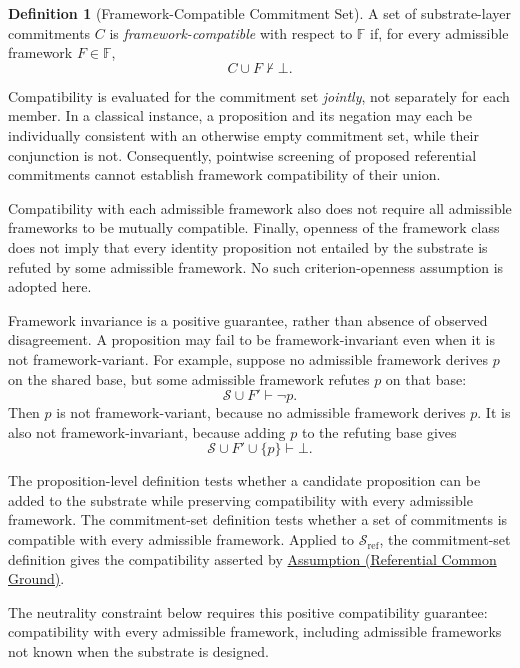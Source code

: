 \documentclass[11pt]{article}
\theoremstyle{plain}
\theoremstyle{definition}
\newtheorem{definition}[theorem]{Definition}
\theoremstyle{remark}
\newcommand{\AssumpRef}[2]{\hyperref[#1]{Assumption (#2)}}
\newcommand{\Substrate}{\mathcal{S}}
\newcommand{\SubstrateRef}{\mathcal{S}_{\mathrm{ref}}}
\newcommand{\Frameworks}{\mathbb{F}}
\newcommand{\Framework}{F}
\newcommand{\entails}{\vdash}
\newcommand{\notentails}{\nvdash}
\begin{document}
\begin{definition}[Framework-Compatible Commitment Set]
  \label{se100.def.FrameworkCompatibleCommitmentSet}
  A set of substrate-layer commitments $C$ is \emph{framework-compatible}
  with respect to $\Frameworks$ if, for every admissible framework
  $\Framework \in \Frameworks$,
  \[
    C \cup \Framework \notentails \bot .
  \]
\end{definition}

Compatibility is evaluated for the commitment set \emph{jointly},
not separately for each member.
In a classical instance,
a proposition and its negation may each be individually consistent
with an otherwise empty commitment set, while their conjunction is not.
Consequently, pointwise screening of proposed referential commitments
cannot establish framework compatibility of their union.

Compatibility with each admissible framework also does not require
all admissible frameworks to be mutually compatible.
Finally, openness of the framework class does not imply
that every identity proposition not entailed by the substrate
is refuted by some admissible framework.
No such criterion-openness assumption is adopted here.

Framework invariance is a positive guarantee,
rather than absence of observed disagreement.
A proposition may fail to be framework-invariant
even when it is not framework-variant.
For example,
suppose no admissible framework derives $p$ on the shared base,
but some admissible framework refutes $p$ on that base:
\[
  \Substrate \cup \Framework' \entails \neg p .
\]
Then $p$ is not framework-variant, because no admissible framework derives $p$.
It is also not framework-invariant, because adding $p$ to the refuting base gives
\[
  \Substrate \cup \Framework' \cup \{p\} \entails \bot .
\]

The proposition-level definition tests whether a candidate proposition
can be added to the substrate while preserving compatibility with every
admissible framework.
The commitment-set definition tests whether a set of commitments is
compatible with every admissible framework.
Applied to $\SubstrateRef$,
the commitment-set definition gives the compatibility asserted by
\AssumpRef{se100.assump.ReferentialCommonGround}{Referential Common Ground}.

The neutrality constraint below requires this positive compatibility guarantee:
compatibility with every admissible framework,
including admissible frameworks not known when the substrate is designed.
\end{document}
